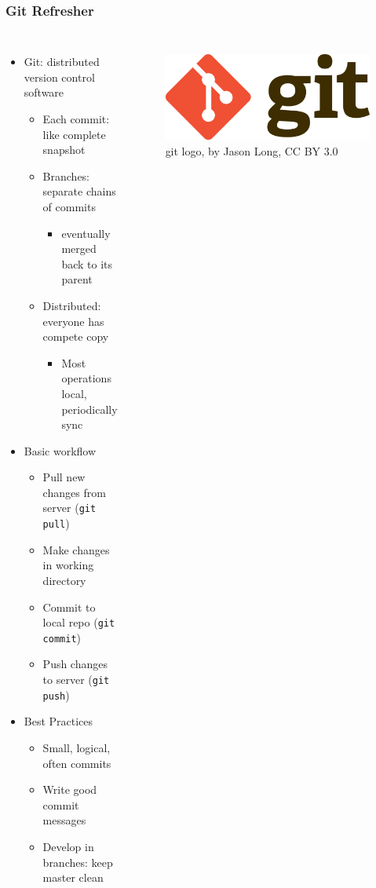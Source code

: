 \documentclass{beamer}
\begin{document}
\begin{frame}
\frametitle{Git Refresher}
\begin{columns}[t]
\begin{itemize}
  \item Git: distributed version control software
  \begin{itemize}
    \item Each commit: like complete snapshot
    \item Branches: separate chains of commits
    \begin{itemize}
      \item eventually merged back to its parent
    \end{itemize}
    \item Distributed: everyone has compete copy
    \begin{itemize}
      \item Most operations local, periodically sync
    \end{itemize}
  \end{itemize}
  \item Basic workflow
  \begin{itemize}
    \item Pull new changes from server (\texttt{git pull})
    \item Make changes in working directory
    \item Commit to local repo (\texttt{git commit})
    \item Push changes to server (\texttt{git push})
  \end{itemize}
  \item Best Practices
  \begin{itemize}
    \item Small, logical, often commits
    \item Write good commit messages
    \item Develop in branches: keep master clean
  \end{itemize}
\end{itemize}

\begin{figure}
\centering
\includegraphics[width=1.0\columnwidth]{images-dis1/Git-Logo-2Color}
\newline
{\tiny git logo, by Jason Long, CC BY 3.0}
\end{figure}
\end{columns}
\end{frame}
\end{document}
